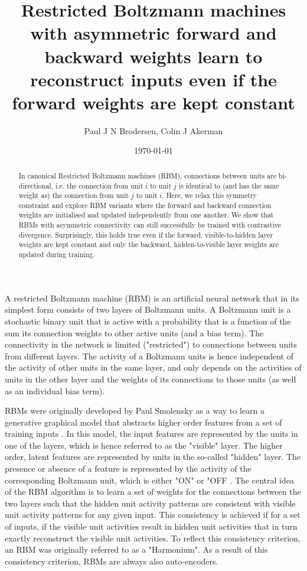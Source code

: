 \documentclass[11pt]{article}
\author{Paul J N Brodersen, Colin J Akerman}
\date{\today}
\title{Restricted Boltzmann machines with asymmetric forward and backward weights learn to reconstruct inputs even if the forward weights are kept constant}
\begin{document}
\maketitle

\begin{abstract}
In canonical Restricted Boltzmann machines (RBM), connections between
units are bi-directional, i.e. the connection from unit $i$ to unit
$j$ is identical to (and has the same weight as) the connection from
unit $j$ to unit $i$. Here, we relax this symmetry constraint and
explore RBM variants where the forward and backward connection weights
are initialised and updated independently from one another. We show
that RBMs with asymmetric connectivity can still successfully be
trained with contrastive divergence. Surprisingly, this holds true
even if the forward, visible-to-hidden layer weights are kept constant
and only the backward, hidden-to-visible layer weights are updated
during training.
\end{abstract}

A restricted Boltzmann machine (RBM) is an artificial neural network
that in its simplest form consists of two layers of Boltzmann units.
A Boltzmann unit is a stochastic binary unit that is active with a
probability that is a function of the sum its connection weights to
other active units (and a bias term). The connectivity in the network
is limited ("restricted") to connections between units from different
layers. The activity of a Boltzmann units is hence independent of the
activity of other units in the same layer, and only depends on the
activities of units in the other layer and the weights of its
connections to those units (as well as an individual bias term).

RBMs were originally developed by Paul Smolensky as a way to learn a
generative graphical model that abstracts higher order features from a
set of training inputs \cite{Smolensky1986a}. In this model, the input
features are represented by the units in one of the layers, which is
hence referred to as the "visible" layer. The higher order, latent
features are represented by units in the so-called "hidden" layer.
The presence or absence of a feature is represented by the activity of
the corresponding Boltzmann unit, which is either "ON" or "OFF . The
central idea of the RBM algorithm is to learn a set of weights for the
connections between the two layers such that the hidden unit activity
patterns are consistent with visible unit activity patterns for any
given input. This consistency is achieved if for a set of inputs, if
the visible unit activities result in hidden unit activities that in
turn exactly reconstruct the visible unit activities. To reflect this
consistency criterion, an RBM was originally referred to as a
"Harmonium". As a result of this consistency criterion, RBMs are
always also auto-encoders.
\end{document}
